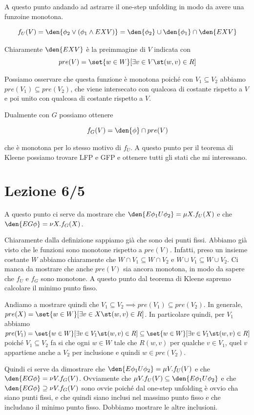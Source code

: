 A questo punto andando ad astrarre il one-step unfolding in modo da avere una funzoine monotona.

\[f_U (V) = \den{\phi_2 \lor (\phi_1 \land EX V)} = \den{\phi_2} \cup \den{\phi_1}\cap \den{EX V} \]

Chiaramente \(\den{EX V}\) è la preimmagine di \(V\) indicata con 
\[pre(V) = \set{w \in W}[\exists v \in V\st (w,v) \in R]\]

Possiamo osservare che questa funzione è monotona poiché con \(V_1 \subseteq V_2\) abbiamo \(pre(V_1) \subseteq pre(V_2)\), che viene intersecato con qualcosa di costante rispetto a \(V\) e poi unito con qualcosa di costante rispetto a \(V\).

Dualmente con \(G\) possiamo ottenere 

\[f_G (V) = \den{\phi} \cap pre(V)\]

che è monotona per lo stesso motivo di \(f_U\). A questo punto per il teorema di Kleene possiamo trovare LFP e GFP e ottenere tutti gli stati che mi interessano.

\chapter{Lezione 6/5}

A questo punto ci serve da mostrare che \(\den{E \phi_1 U \phi_2} = \mu X . f_U(X)\) e che \(\den{EG \phi} = \nu X . f_G(X)\).

Chiaramente dalla definizione sappiamo già che sono dei punti fissi. Abbiamo già visto che le funzioni sono monotone rispetto a \(pre(V)\). Infatti, preso un insieme costante \(W\) abbiamo chiaramente che \(W\cap V_1 \subseteq W\cap V_2\) e \(W\cup V_1 \subseteq W\cup V_2\). Ci manca da mostrare che anche \(pre(V)\) sia ancora monotona, in modo da sapere che \(f_U\) e \(f_G\) sono monotone.
A questo punto dal teorema di Kleene sapremo calcolare il minimo punto fisso.

Andiamo a mostrare quindi che \(V_1 \subseteq V_2 \implies pre(V_1)\subseteq pre(V_2)\).
In generale, \(pre(X) = \set{w \in W}[\exists v \in X\st (w,v) \in R]\). In particolare quindi, per \(V_1\) abbiamo \(pre(V_1) = \set{w \in W}[\exists v \in V_1\st (w,v) \in R] \subseteq \set{w \in W}[\exists v \in V_1\st (w,v) \in R]\) poiché \(V_1 \subseteq V_2\) fa si che ogni \(w\in W\) tale che \(R(w,v)\) per qualche \(v \in V_1\), quel \(v\) appartiene anche a \(V_2\) per inclusione e quindi \(w \in pre(V_2)\).

Quindi ci serve da dimostrare che \(\den{E \phi_1 U \phi_2} = \mu V . f_U(V)\) e che \(\den{EG \phi} = \nu V. f_G(V)\).
Ovviamente che \(\mu V . f_U(V)\subseteq \den{E \phi_1 U \phi_2}\) e che \(\den{EG \phi}\supseteq \nu V . f_G(V)\) sono ovvie poiché dal one-step unfolding è ovvio cha siano punti fissi, e che quindi siano inclusi nel massimo punto fisso e che includano il minimo punto fisso. Dobbiamo mostrare le altre inclusioni.


